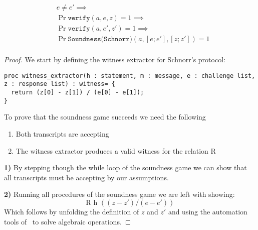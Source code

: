\begin{lemma}
  \begin{align*}
    &e \neq e' \implies \\
    &\Pr{\texttt{verify}(a, e, z)} = 1 \implies \\
    &\Pr{\texttt{verify}(a, e', z')} = 1 \implies \\
    &\Pr{\texttt{Soundness(Schnorr)}(a, [e; e'], [z; z'])} = 1 \\
  \end{align*}
\end{lemma}
\begin{proof}
  We start by defining the witness extractor for Schnorr's protocol:
\begin{lstlisting}
proc witness_extractor(h : statement, m : message, e : challenge list, z : response list) : witness= {
  return (z[0] - z[1]) / (e[0] - e[1]);
}
\end{lstlisting}
  To prove that the soundness game succeeds we need the following
  \begin{enumerate}
    \item Both transcripts are accepting
    \item The witness extractor produces a valid witness for the relation R
  \end{enumerate}

  \textbf{1)} By stepping though the while loop of the soundness game we can
  show that all transcripts must be accepting by our assumptions.

  \noindent \textbf{2)} Running all procedures of the soundness game we are left
  with showing:
  \begin{equation*}
    \text{R h } ((z - z') / (e - e'))
  \end{equation*}
  Which follows by unfolding the definition of $z$ and $z'$ and using the
  automation tools of \easycrypt\  to solve algebraic operations.
\end{proof}


